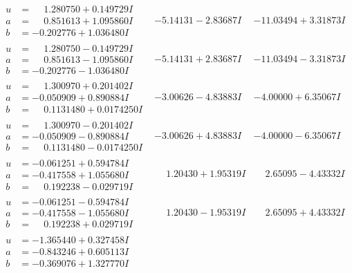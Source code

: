 \documentclass[1p]{elsarticle_modified}
\theoremstyle{definition}
\begin{document}
$$\begin{array}{c|c|c}
\begin{aligned}
u &= \phantom{-}1.280750 + 0.149729 I \\
a &= \phantom{-}0.851613 + 1.095860 I \\
b &= -0.202776 + 1.036480 I\end{aligned}
 & -5.14131 - 2.83687 I & -11.03494 + 3.31873 I \\ \hline\begin{aligned}
u &= \phantom{-}1.280750 - 0.149729 I \\
a &= \phantom{-}0.851613 - 1.095860 I \\
b &= -0.202776 - 1.036480 I\end{aligned}
 & -5.14131 + 2.83687 I & -11.03494 - 3.31873 I \\ \hline\begin{aligned}
u &= \phantom{-}1.300970 + 0.201402 I \\
a &= -0.050909 + 0.890884 I \\
b &= \phantom{-}0.1131480 + 0.0174250 I\end{aligned}
 & -3.00626 - 4.83883 I & -4.00000 + 6.35067 I \\ \hline\begin{aligned}
u &= \phantom{-}1.300970 - 0.201402 I \\
a &= -0.050909 - 0.890884 I \\
b &= \phantom{-}0.1131480 - 0.0174250 I\end{aligned}
 & -3.00626 + 4.83883 I & -4.00000 - 6.35067 I \\ \hline\begin{aligned}
u &= -0.061251 + 0.594784 I \\
a &= -0.417558 + 1.055680 I \\
b &= \phantom{-}0.192238 - 0.029719 I\end{aligned}
 & \phantom{-}1.20430 + 1.95319 I & \phantom{-}2.65095 - 4.43332 I \\ \hline\begin{aligned}
u &= -0.061251 - 0.594784 I \\
a &= -0.417558 - 1.055680 I \\
b &= \phantom{-}0.192238 + 0.029719 I\end{aligned}
 & \phantom{-}1.20430 - 1.95319 I & \phantom{-}2.65095 + 4.43332 I \\ \hline\begin{aligned}
u &= -1.365440 + 0.327458 I \\
a &= -0.843246 + 0.605113 I \\
b &= -0.369076 + 1.327770 I\end{aligned}

\end{array}$$
\end{document}
